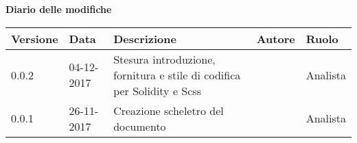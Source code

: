 \documentclass[NormeDiProgetto.tex]{subfiles}
\begin{document}
	
	\huge \bfseries Diario delle modifiche\\
	\begin{table}[htbp]
		\centering
		\renewcommand\arraystretch{1.2}
		
		\begin{tabularx}{\textwidth}{p{2cm}|p{2cm}|p{4cm}|p{2cm}|p{2cm}}
			\hline
			\textbf{Versione} & \textbf{Data} & \textbf{Descrizione} & \textbf{Autore} & \textbf{Ruolo}\\
			\hline
			0.0.2 & 04-12-2017 & Stesura introduzione, fornitura e stile di codifica per Solidity e Scss & \Elena & Analista \\
			\hline
			0.0.1 & 26-11-2017 & Creazione scheletro del documento & \Elena & Analista \\
			\hline
			
		\end{tabularx}
		
	\end{table}
\end{document}
